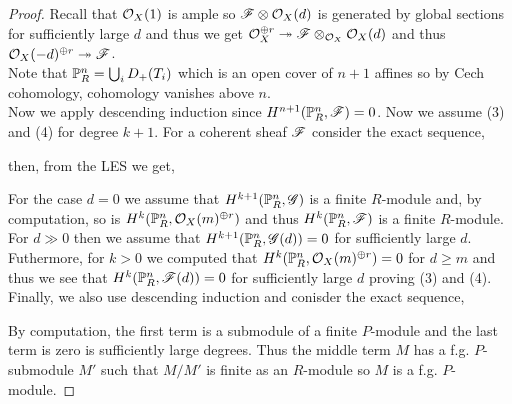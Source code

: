 \documentclass[12pt]{article}
\begin{document}
\begin{proof}
Recall that $\struct{X}(1)$ is ample so $\F \otimes \struct{X}(d)$ is generated by global sections for sufficiently large $d$ and thus we get $\struct{X}^{\oplus r} \onto \F \otimes_{\struct{X}} \struct{X}(d)$ and thus $\struct{X}(-d)^{\oplus r} \onto \F$.
\bigskip\\
Note that $\P^n_R = \bigcup_i D_+(T_i)$ which is an open cover of $n+1$ affines so by Cech cohomology, cohomology vanishes above $n$.
\bigskip\\
Now we apply descending induction since $H^{n+1}(\P^n_R, \F) = 0$. Now we assume (3) and (4) for degree $k+1$. For a coherent sheaf $\F$ consider the exact sequence,
\begin{center}
\end{center}
then, from the LES we get,
\begin{center}
\end{center}
For the case $d = 0$ we assume that $H^{k+1}(\P^n_R, \G)$ is a finite $R$-module and, by computation, so is $H^k(\P^n_R, \struct{X}(m)^{\oplus r})$ and thus $H^k(\P^n_R, \F)$ is a finite $R$-module. For $d \gg 0$ then we assume that $H^{k+1}(\P^n_R, \G(d)) = 0$ for sufficiently large $d$. Futhermore, for $k > 0$ we computed that $H^k(\P^n_R, \struct{X}(m)^{\oplus r}) = 0$ for $d \ge m$ and thus we see that $H^k(\P^n_R, \F(d)) = 0$ for sufficiently large $d$ proving (3) and (4).
\bigskip\\
Finally, we also use descending induction and conisder the exact sequence,
\begin{center}
\end{center}
By computation, the first term is a submodule of a finite $P$-module and the last term is zero is sufficiently large degrees. Thus the middle term $M$ has a f.g. $P$-submodule $M'$ such that $M / M'$ is finite as an $R$-module so $M$ is a f.g. $P$-module. 
\end{proof}
\end{document}
